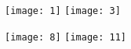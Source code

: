 \documentclass{article}
\begin{document}
\begin{figure}[htp]
\centering
\texttt{[image: 1]}\quad
\texttt{[image: 3]}

\medskip

\texttt{[image: 8]}\quad
\texttt{[image: 11]}
\end{figure}
\end{document}
